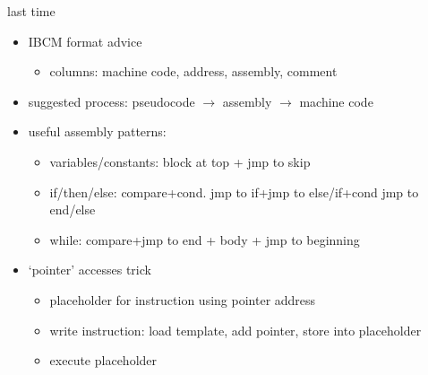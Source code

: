 \begin{frame}{last time}
    \begin{itemize}
    \item IBCM format advice
            \begin{itemize}
            \item columns: machine code, address, assembly, comment
            \end{itemize}
    \item suggested process: pseudocode $\rightarrow$ assembly $\rightarrow$ machine code
    \item useful assembly patterns:
        \begin{itemize}
            \item variables/constants: block at top + jmp to skip
            \item if/then/else: compare+cond. jmp to if+jmp to else/if+cond jmp to end/else
            \item while: compare+jmp to end + body + jmp to beginning
        \end{itemize}
    \item `pointer' accesses trick
        \begin{itemize}
        \item placeholder for instruction using pointer address
        \item write instruction: load template, add pointer, store into placeholder
        \item execute placeholder
        \end{itemize}
    \end{itemize}
\end{frame}
